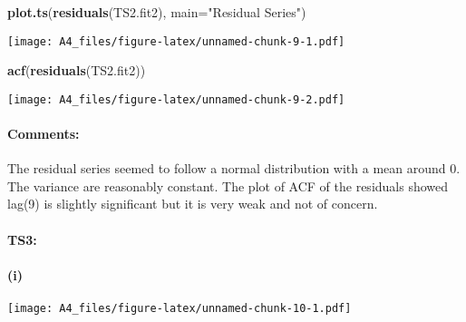 \documentclass[]{article}
\newenvironment{Shaded}{\begin{snugshade}}{\end{snugshade}}
\newcommand{\DataTypeTok}[1]{\textcolor[rgb]{0.13,0.29,0.53}{#1}}
\newcommand{\KeywordTok}[1]{\textcolor[rgb]{0.13,0.29,0.53}{\textbf{#1}}}
\newcommand{\NormalTok}[1]{#1}
\newcommand{\OperatorTok}[1]{\textcolor[rgb]{0.81,0.36,0.00}{\textbf{#1}}}
\newcommand{\StringTok}[1]{\textcolor[rgb]{0.31,0.60,0.02}{#1}}
\let\oldparagraph\paragraph
\renewcommand{\paragraph}[1]{\oldparagraph{#1}\mbox{}}
\begin{document}
\begin{Shaded}
\begin{Highlighting}[]
\KeywordTok{plot.ts}\NormalTok{(}\KeywordTok{residuals}\NormalTok{(TS2.fit2), }\DataTypeTok{main=}\StringTok{"Residual Series"}\NormalTok{)}
\end{Highlighting}
\end{Shaded}

\texttt{[image: A4\_files/figure-latex/unnamed-chunk-9-1.pdf]}

\begin{Shaded}
\begin{Highlighting}[]
\KeywordTok{acf}\NormalTok{(}\KeywordTok{residuals}\NormalTok{(TS2.fit2))}
\end{Highlighting}
\end{Shaded}

\texttt{[image: A4\_files/figure-latex/unnamed-chunk-9-2.pdf]}

\hypertarget{comments-2}{%
\paragraph{Comments:}\label{comments-2}}

The residual series seemed to follow a normal distribution with a mean
around 0. The variance are reasonably constant. The plot of ACF of the
residuals showed lag(9) is slightly significant but it is very weak and
not of concern.

\hypertarget{ts3}{%
\paragraph{TS3:}\label{ts3}}

\hypertarget{i-2}{%
\paragraph{(i)}\label{i-2}}

\begin{Shaded}
\end{Shaded}

\texttt{[image: A4\_files/figure-latex/unnamed-chunk-10-1.pdf]}

\begin{Shaded}
\end{Shaded}
\end{document}
